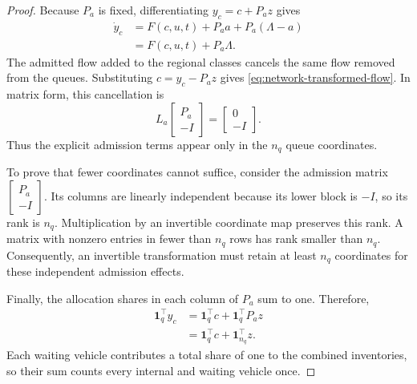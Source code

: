 \documentclass[preprint,12pt]{elsarticle}
\begin{document}
\begin{proof}
Because $P_a$ is fixed, differentiating $y_c=c+P_a z$ gives
\[
\begin{aligned}
 \dot y_c
 &=F(c,u,t)+P_a a+P_a(\Lambda-a)\\
 &=F(c,u,t)+P_a\Lambda.
\end{aligned}
\]
The admitted flow added to the regional classes cancels the same flow
removed from the queues. Substituting $c=y_c-P_a z$ gives
\eqref{eq:network-transformed-flow}. In matrix form, this cancellation is
\[
 L_a\begin{bmatrix}P_a\\-I\end{bmatrix}
 =\begin{bmatrix}0\\-I\end{bmatrix}.
\]
Thus the explicit admission terms appear only in the $n_q$ queue
coordinates.

To prove that fewer coordinates cannot suffice, consider the admission
matrix $\begin{bmatrix}P_a\\-I\end{bmatrix}$. Its columns are linearly
independent because its lower block is $-I$, so its rank is $n_q$.
Multiplication by an invertible coordinate map preserves this rank.
A matrix with nonzero entries in fewer than $n_q$ rows has rank smaller
than $n_q$. Consequently, an invertible transformation must retain at
least $n_q$ coordinates for these independent admission effects.

Finally, the allocation shares in each column of $P_a$ sum to one.
Therefore,
\[
\begin{aligned}
 \mathbf1_q^\top y_c
 &=\mathbf1_q^\top c+\mathbf1_q^\top P_a z\\
 &=\mathbf1_q^\top c+\mathbf1_{n_q}^\top z.
\end{aligned}
\]
Each waiting vehicle contributes a total share of one to the combined
inventories, so their sum counts every internal and waiting vehicle once.
\end{proof}
\end{document}
